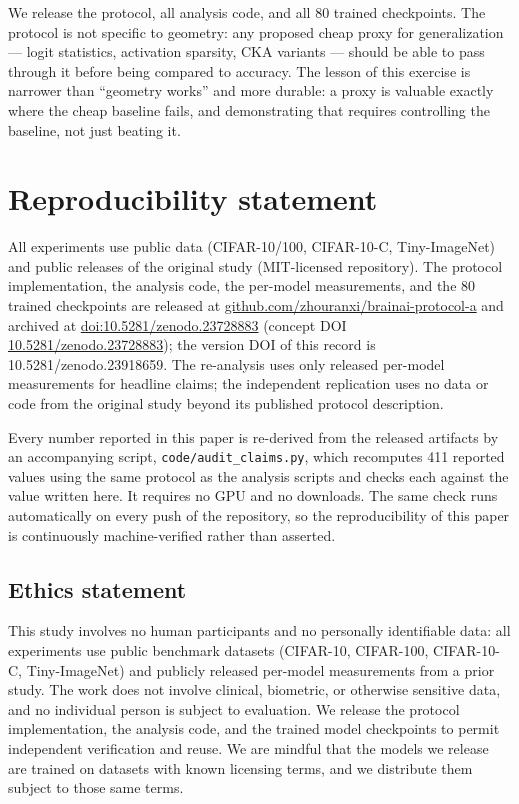 \documentclass[10pt]{article} %
\begin{document}
We release the protocol, all analysis code, and all 80 trained checkpoints. The protocol is not specific to geometry: any proposed cheap proxy for generalization --- logit statistics, activation sparsity, CKA variants --- should be able to pass through it before being compared to accuracy. The lesson of this exercise is narrower than ``geometry works'' and more durable: a proxy is valuable exactly where the cheap baseline fails, and demonstrating that requires controlling the baseline, not just beating it.

\section{Reproducibility statement}
\label{sec:repro}

All experiments use public data (CIFAR-10/100, CIFAR-10-C, Tiny-ImageNet) and public releases of the original study (MIT-licensed repository). The protocol implementation, the analysis code, the per-model measurements, and the 80 trained checkpoints are released at \href{https://github.com/zhouranxi/brainai-protocol-a}{github.com/zhouranxi/brainai-protocol-a} and archived at \href{https://doi.org/10.5281/zenodo.23728883}{doi:10.5281/zenodo.23728883} (concept DOI \href{https://doi.org/10.5281/zenodo.23728883}{10.5281/zenodo.23728883}); the version DOI of this record is 10.5281/zenodo.23918659. The re-analysis uses only released per-model measurements for headline claims; the independent replication uses no data or code from the original study beyond its published protocol description.

Every number reported in this paper is re-derived from the released artifacts by an accompanying script, \texttt{code/audit\_claims.py}, which recomputes 411 reported values using the same protocol as the analysis scripts and checks each against the value written here. It requires no GPU and no downloads. The same check runs automatically on every push of the repository, so the reproducibility of this paper is continuously machine-verified rather than asserted.

\subsection*{Ethics statement}

This study involves no human participants and no personally identifiable data: all experiments use public benchmark datasets (CIFAR-10, CIFAR-100, CIFAR-10-C, Tiny-ImageNet) and publicly released per-model measurements from a prior study. The work does not involve clinical, biometric, or otherwise sensitive data, and no individual person is subject to evaluation. We release the protocol implementation, the analysis code, and the trained model checkpoints to permit independent verification and reuse. We are mindful that the models we release are trained on datasets with known licensing terms, and we distribute them subject to those same terms.
\end{document}
